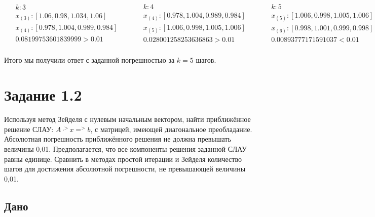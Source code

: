 \documentclass[letterpaper, 11pt]{extarticle}
\begin{document}
\begin{align*}
    \begin{aligned}
        & k: 3 \\
        & x_{(3)}: [1.06,  0.98,  1.034, 1.06 ] \\
        & x_{(4)}: [0.978, 1.004, 0.989, 0.984] \\
        & 0.08199753601839999 > 0.01
    \end{aligned}
    \qquad
    \begin{aligned}
        & k: 4 \\
        & x_{(4)}: [0.978, 1.004, 0.989, 0.984] \\
        & x_{(5)}: [1.006, 0.998, 1.005, 1.006] \\
        & 0.028001258253636863 > 0.01
    \end{aligned}
    \qquad
    \begin{aligned}
        & k: 5 \\
        & x_{(5)}: [1.006, 0.998, 1.005, 1.006] \\
        & x_{(6)}: [0.998, 1.001, 0.999, 0.998] \\
        & 0.00893777171591037 < 0.01
    \end{aligned}
\end{align*}\\

\noindent Итого мы получили ответ с заданной погрешностью за $ k = 5 $ шагов. 

\section*{Задание 1.2}

Используя метод Зейделя с нулевым начальным вектором, найти приближённое
решение СЛАУ: $A \cdot ^>x = ^>b$, с матрицей, имеющей диагональное преобладание.
Абсолютная погрешность приближённого решения не должна превышать величины 0,01.
Предполагается, что все компоненты решения заданной СЛАУ равны единице.
Сравнить в методах простой итерации и
Зейделя количество шагов для достижения абсолютной погрешности, не превышающей
величины 0,01.

\subsection*{Дано}
\end{document}
